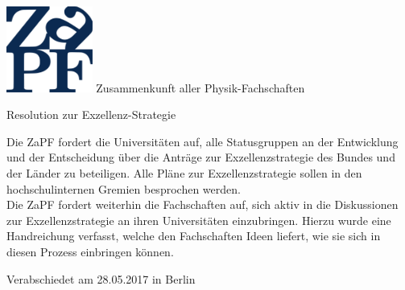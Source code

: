 \documentclass[DIV=calc]{scrartcl}
\begin{document}
    \hspace{0.87\textwidth}
    \begin{minipage}{120pt}
        \vspace{-1.8cm}
        \includegraphics[width=80pt]{logo.pdf}
        \centering
        \small Zusammenkunft aller Physik-Fachschaften
    \end{minipage}
    \begin{center}
        \huge{Resolution zur Exzellenz-Strategie} \\
        \normalsize
    \end{center}
    
    \vspace{1cm}    
Die ZaPF fordert die Universitäten auf, alle Statusgruppen an der Entwicklung und der
Entscheidung über die Anträge zur Exzellenzstrategie des Bundes und der Länder zu beteiligen.
Alle Pläne zur Exzellenzstrategie sollen in den hochschulinternen Gremien besprochen werden.\\ Die
ZaPF fordert weiterhin die Fachschaften auf, sich aktiv in die Diskussionen zur Exzellenzstrategie
an ihren Universitäten einzubringen. Hierzu wurde eine Handreichung verfasst, welche den
Fachschaften Ideen liefert, wie sie sich in diesen Prozess einbringen können.  
    \vfill
    \begin{flushright}
        Verabschiedet am 28.05.2017 in Berlin
    \end{flushright}
    
\end{document}
